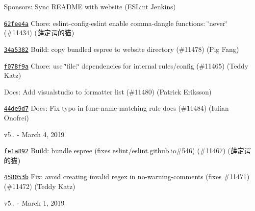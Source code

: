 \begin{DoxyItemize}
$$\item \href{https://github.com/eslint/eslint/commit/6693161978a83e0730d5ea0fecdb627c5a2acdfd}{\texttt{ {}}} Sponsors\+: Sync R\+E\+A\+D\+ME with website (E\+S\+Lint Jenkins)
\item \href{https://github.com/eslint/eslint/commit/62fee4a976897d158c8c137339728cd280333286}{\texttt{ {\ttfamily 62fee4a}}} Chore\+: eslint-\/config-\/eslint enable comma-\/dangle functions\+: \char`\"{}never\char`\"{} (\#11434) (薛定谔的猫)
\item \href{https://github.com/eslint/eslint/commit/34a53829e7a63ff2f6b371d77ce283bbdd373b91}{\texttt{ {\ttfamily 34a5382}}} Build\+: copy bundled espree to website directory (\#11478) (Pig Fang)
\item \href{https://github.com/eslint/eslint/commit/f078f9a9e094ec00c61a6ef1c9550d017631e69a}{\texttt{ {\ttfamily f078f9a}}} Chore\+: use \char`\"{}file\+:\char`\"{} dependencies for internal rules/config (\#11465) (Teddy Katz)
\item \href{https://github.com/eslint/eslint/commit/075612871f85aa04cef8137bd32247e128ad600b}{\texttt{ {}}} Docs\+: Add {\ttfamily visualstudio} to formatter list (\#11480) (Patrick Eriksson)
\item \href{https://github.com/eslint/eslint/commit/44de9d7e1aa2fcae475a97b8f597b7d8094566b2}{\texttt{ {\ttfamily 44de9d7}}} Docs\+: Fix typo in func-\/name-\/matching rule docs (\#11484) (Iulian Onofrei)
\end{DoxyItemize}

v5.. -\/ March 4, 2019


\begin{DoxyItemize}
\item \href{https://github.com/eslint/eslint/commit/fe1a892f85b09c3d2fea05bef011530a678a6af5}{\texttt{ {\ttfamily fe1a892}}} Build\+: bundle espree (fixes eslint/eslint.\+github.\+io\#546) (\#11467) (薛定谔的猫)
\item \href{https://github.com/eslint/eslint/commit/458053b0b541f857bf233dacbde5ba80681820f8}{\texttt{ {\ttfamily 458053b}}} Fix\+: avoid creating invalid regex in no-\/warning-\/comments (fixes \#11471) (\#11472) (Teddy Katz)
\end{DoxyItemize}

v5.. -\/ March 1, 2019


